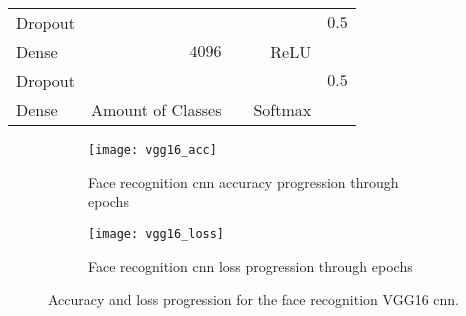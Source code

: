 \begin{table}[H]
\begin{tabular}{lrrrr}
		Dropout                 &                           &                           &                     & $0.5$          \\
		Dense                   & $4096$                    &                           & ReLU                &                \\
		\rowcolor{lightGrey} 
		Dropout                 &                           &                           &                     & $0.5$          \\
		Dense                   & Amount of Classes         &                           & Softmax             &               
	\end{tabular}
\end{table}

\begin{figure}[H]
	\centering
	\begin{subfigure}{0.48\textwidth}
		\centering
		\texttt{[image: vgg16\_acc]}
		\caption{Face recognition \gls{cnn} accuracy progression through epochs}
		\label{fig:vgg16_acc}
	\end{subfigure}
	\begin{subfigure}{0.48\textwidth}
		\centering
		\texttt{[image: vgg16\_loss]}
		\caption{Face recognition \gls{cnn} loss progression through epochs}
		\label{fig:vgg16_loss}
	\end{subfigure}
	\caption{Accuracy and loss progression for the face recognition VGG16 \gls{cnn}.}
	\label{fig:vgg_graphs}
\end{figure}
